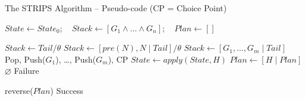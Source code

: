 \documentclass[presentation]{beamer}\mode<presentation>{\usetheme{AMSBolognaFC}}
\begin{document}
\begin{frame}[c]{The STRIPS Algorithm -- Pseudo-code \hfill {\scriptsize(CP = Choice Point)}}

    	\begin{algorithmic}\small

    			\State $State \leftarrow State_0$; ~ $Stack \leftarrow [G_1 \wedge \dots \wedge G_n]$; ~ $Plan \leftarrow []$

    			\State

    			 
    					\State $Stack \leftarrow Tail / \theta$ 
    				 
    					\State $Stack \leftarrow [pre(N), N \mid Tail] / \theta$  
    					\State $Stack \leftarrow [G_1, \ldots, G_m \mid Tail]$ \Comment Pop, Push($G_1$), \ldots, Push($G_m$), \alert{CP}
    					\State $State \leftarrow apply(State, H)$
    					\State $Plan \leftarrow [H \mid Plan]$
    				\Else
    					\State \Return $\varnothing$ \Comment Failure
    				\EndIf
    			\EndWhile

    			\State

    			\State \Return reverse($Plan$) \Comment Success
    		\EndFunction
    	\end{algorithmic}

\end{frame}
\end{document}
